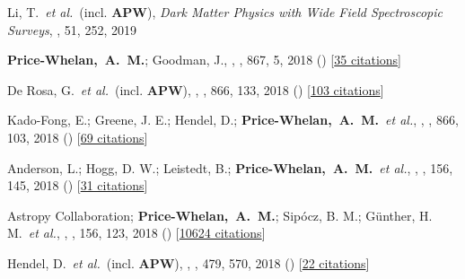 \item[{\color{deemph}\scriptsize48}]Li, T.~\textit{et al.}~(incl. \textbf{APW}), \textit{Dark Matter Physics with Wide Field Spectroscopic Surveys}, \baas, 51, 252, 2019

\item[{\color{deemph}\scriptsize47}]\textbf{Price-Whelan,~A.~M.}; Goodman, J., , \apj, 867, 5, 2018 () [\href{http://adsabs.harvard.edu/abs/2018ApJ...867....5P}{35 citations}]

\item[{\color{deemph}\scriptsize46}]De Rosa, G.~\textit{et al.}~(incl. \textbf{APW}), , \apj, 866, 133, 2018 () [\href{http://adsabs.harvard.edu/abs/2018ApJ...866..133D}{103 citations}]

\item[{\color{deemph}\scriptsize45}]Kado-Fong, E.; Greene, J. E.; Hendel, D.; \textbf{Price-Whelan,~A.~M.}~\textit{et al.}, , \apj, 866, 103, 2018 () [\href{http://adsabs.harvard.edu/abs/2018ApJ...866..103K}{69 citations}]

\item[{\color{deemph}\scriptsize44}]Anderson, L.; Hogg, D. W.; Leistedt, B.; \textbf{Price-Whelan,~A.~M.}~\textit{et al.}, , \aj, 156, 145, 2018 () [\href{http://adsabs.harvard.edu/abs/2018AJ....156..145A}{31 citations}]

\item[{\color{deemph}\scriptsize43}]Astropy Collaboration; \textbf{Price-Whelan,~A.~M.}; Sip{\'{o}}cz, B. M.; G{\"u}nther, H. M.~\textit{et al.}, , \aj, 156, 123, 2018 () [\href{http://adsabs.harvard.edu/abs/2018AJ....156..123A}{10624 citations}]

\item[{\color{deemph}\scriptsize42}]Hendel, D.~\textit{et al.}~(incl. \textbf{APW}), , \mnras, 479, 570, 2018 () [\href{http://adsabs.harvard.edu/abs/2018MNRAS.479..570H}{22 citations}]

